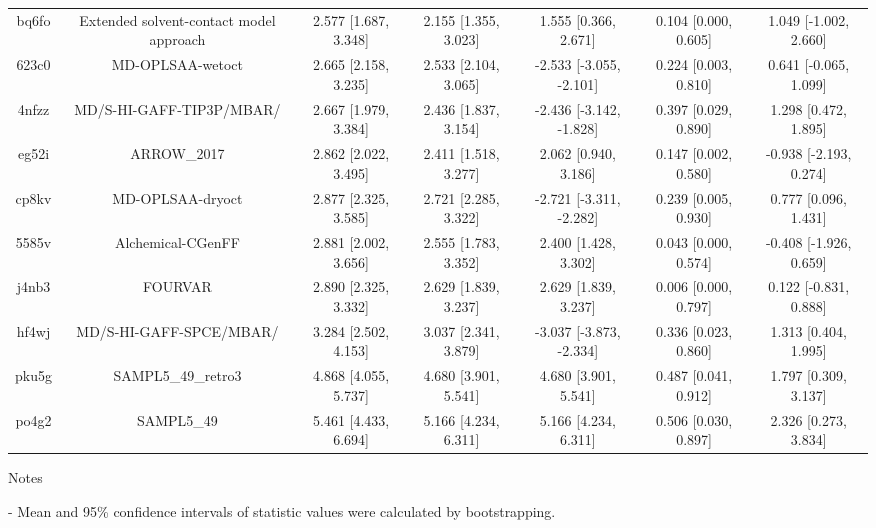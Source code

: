 \documentclass{article}
\begin{document}
\begin{center}
\begin{longtable}{|ccccccc|}
 bq6fo &            Extended solvent-contact model approach &  2.577 [1.687, 3.348] &  2.155 [1.355, 3.023] &     1.555 [0.366, 2.671] &  0.104 [0.000, 0.605] &   1.049 [-1.002, 2.660] \\
 623c0 &                                   MD-OPLSAA-wetoct &  2.665 [2.158, 3.235] &  2.533 [2.104, 3.065] &  -2.533 [-3.055, -2.101] &  0.224 [0.003, 0.810] &   0.641 [-0.065, 1.099] \\
 4nfzz &                           MD/S-HI-GAFF-TIP3P/MBAR/ &  2.667 [1.979, 3.384] &  2.436 [1.837, 3.154] &  -2.436 [-3.142, -1.828] &  0.397 [0.029, 0.890] &    1.298 [0.472, 1.895] \\
 eg52i &                                        ARROW\_2017 &  2.862 [2.022, 3.495] &  2.411 [1.518, 3.277] &     2.062 [0.940, 3.186] &  0.147 [0.002, 0.580] &  -0.938 [-2.193, 0.274] \\
 cp8kv &                                   MD-OPLSAA-dryoct &  2.877 [2.325, 3.585] &  2.721 [2.285, 3.322] &  -2.721 [-3.311, -2.282] &  0.239 [0.005, 0.930] &    0.777 [0.096, 1.431] \\
 5585v &                                  Alchemical-CGenFF &  2.881 [2.002, 3.656] &  2.555 [1.783, 3.352] &     2.400 [1.428, 3.302] &  0.043 [0.000, 0.574] &  -0.408 [-1.926, 0.659] \\
 j4nb3 &                                            FOURVAR &  2.890 [2.325, 3.332] &  2.629 [1.839, 3.237] &     2.629 [1.839, 3.237] &  0.006 [0.000, 0.797] &   0.122 [-0.831, 0.888] \\
 hf4wj &                            MD/S-HI-GAFF-SPCE/MBAR/ &  3.284 [2.502, 4.153] &  3.037 [2.341, 3.879] &  -3.037 [-3.873, -2.334] &  0.336 [0.023, 0.860] &    1.313 [0.404, 1.995] \\
 pku5g &                                 SAMPL5\_49\_retro3 &  4.868 [4.055, 5.737] &  4.680 [3.901, 5.541] &     4.680 [3.901, 5.541] &  0.487 [0.041, 0.912] &    1.797 [0.309, 3.137] \\
 po4g2 &                                         SAMPL5\_49 &  5.461 [4.433, 6.694] &  5.166 [4.234, 6.311] &     5.166 [4.234, 6.311] &  0.506 [0.030, 0.897] &    2.326 [0.273, 3.834] \\
\end{longtable}
\end{center}

Notes

- Mean and 95\% confidence intervals of statistic values were calculated by bootstrapping.
\end{document}
